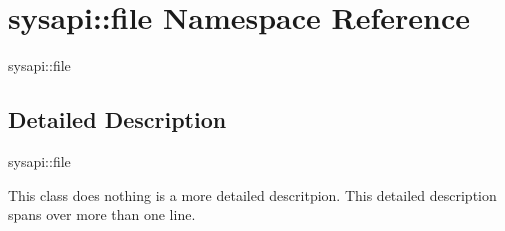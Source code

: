 \section{sysapi::file Namespace Reference}
\label{namespacesysapi_1_1file}
sysapi::file  




\subsection{Detailed Description}
sysapi::file 

This class does nothing is a more detailed descritpion. This detailed description spans over more than one line. 

